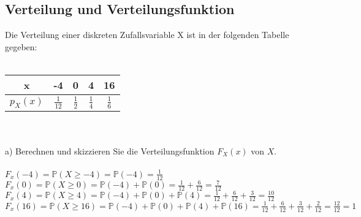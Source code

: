 \documentclass[a4paper]{article}
\begin{document}
\setcounter{section}{3}
\subsection{Verteilung und Verteilungsfunktion}
Die Verteilung einer diskreten Zufallsvariable X ist in der folgenden Tabelle gegeben:\\\\
\begin{tabular}{c|c c c c}
    x & -4 & 0 & 4 & 16 \\
    \hline
    $p_X(x)$ & $\frac{1}{12}$ & $\frac{1}{2}$ & $\frac{1}{4}$ & $\frac{1}{6}$
\end{tabular}\\\\
a) Berechnen und skizzieren Sie die Verteilungsfunktion $F_X(x)$ von $X$.\\\\
$F_x(-4) = \mathbb{P}(X \geq -4) = \mathbb{P}(-4) = \frac{1}{12}$\\
$F_x(0) = \mathbb{P}(X \geq 0) = \mathbb{P}(-4) + \mathbb{P}(0) = \frac{1}{12} + \frac{6}{12} = \frac{7}{12}$\\
$F_x(4) = \mathbb{P}(X \geq 4) = \mathbb{P}(-4) + \mathbb{P}(0) + \mathbb{P}(4) = \frac{1}{12} + \frac{6}{12} + \frac{3}{12} = \frac{10}{12}$\\
$F_x(16) = \mathbb{P}(X \geq 16) = \mathbb{P}(-4) + \mathbb{P}(0) + \mathbb{P}(4) + \mathbb{P}(16) = \frac{1}{12} + \frac{6}{12} + \frac{3}{12} + \frac{2}{12} = \frac{12}{12} = 1$\\\\
\end{document}
